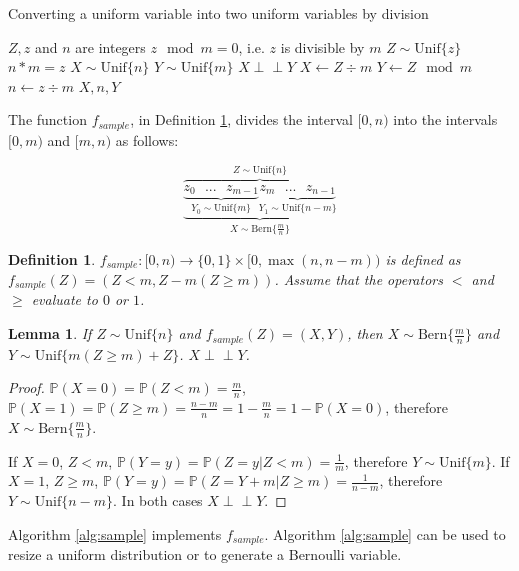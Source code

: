 \documentclass[12pt]{article}
\newtheorem{lemma}{Lemma}
\newtheorem{definition}{Definition}
\newcommand{\indep}{\perp\!\!\!\perp}
\newcommand{\unif}[1]{\mathrm{Unif}\{#1\}}
\newcommand{\bern}[1]{\mathrm{Bern}\{#1\}}
\newcommand{\prob}[1]{\mathbb{P}(#1)}
\begin{document}
\begin{algorithm}
\caption{Converting a uniform variable into two uniform variables by division}
\label{alg:divide}
\begin{algorithmic}[1]
    \Require $Z, z$ and $n$ are integers
    \Require $z \mod m = 0$, i.e. $z$ is divisible by $m$
    \Require $Z \sim \unif{z}$
    \Ensure $n * m = z$
    \Ensure $X \sim \unif{n}$
    \Ensure $Y \sim \unif{m}$
    \Ensure $X \indep Y$
  \State $X \gets Z \div m$
  \State $Y \gets Z \mod m$
  \State $n \gets z \div m$
  \State \Return $X, n, Y$
\EndProcedure
\end{algorithmic}
\end{algorithm}

The function $f_{sample}$, in Definition \ref{def:sample}, divides the interval $[0,n)$ into the intervals $[0,m)$ and $[m, n)$ as follows:

\[
\overbrace{
    \underbrace{
        \underbrace{z_0 \text{   } ... \text{   } z_{m-1}}_{Y_0 \sim \unif{m}}
        \underbrace{z_m \text{   } ... \text{   } z_{n-1}}_{Y_1 \sim \unif{n-m}}}
    }_{X \sim \bern{\frac{m}{n}}}^{Z \sim \unif{n}}
\]

\begin{definition}
$f_{sample}: [0,n) \rightarrow \{0,1\} \times [0,\max(n,n-m))$ is defined as $f_{sample}(Z) = (Z<m, Z - m(Z\ge m))$. Assume that the operators $<$ and $\ge$ evaluate to $0$ or $1$.
\label{def:sample}
\end{definition}

\begin{lemma}
If $Z \sim \unif{n}$ and $f_{sample}(Z) = (X,Y)$, then $X \sim \bern{\frac{m}{n}}$ and $Y \sim \unif{m(Z \ge m)+Z}$. $X \indep Y$.
\label{lem:sample}
\end{lemma}

\begin{proof}
    $\prob{X=0} = \prob{Z < m} = \frac{m}{n}$, $\prob{X=1} = \prob{Z \ge m} = \frac{n-m}{n} = 1 - \frac{m}{n} = 1 - \prob{X=0}$, therefore $X \sim \bern{\frac{m}{n}}$.

    If $X=0$, $Z<m$, $\prob{Y=y} = \prob{Z=y | Z<m} = \frac{1}{m}$, therefore $Y \sim \unif{m}$. If $X=1$, $Z\ge m$, $\prob{Y=y} = \prob{Z = Y + m| Z\ge m} = \frac{1}{n-m}$, therefore $Y \sim \unif{n-m}$. In both cases $X \indep Y$.
\end{proof}

Algorithm \ref{alg:sample} implements $f_{sample}$. Algorithm \ref{alg:sample} can be used to resize a uniform distribution or to generate a Bernoulli variable.
\end{document}
